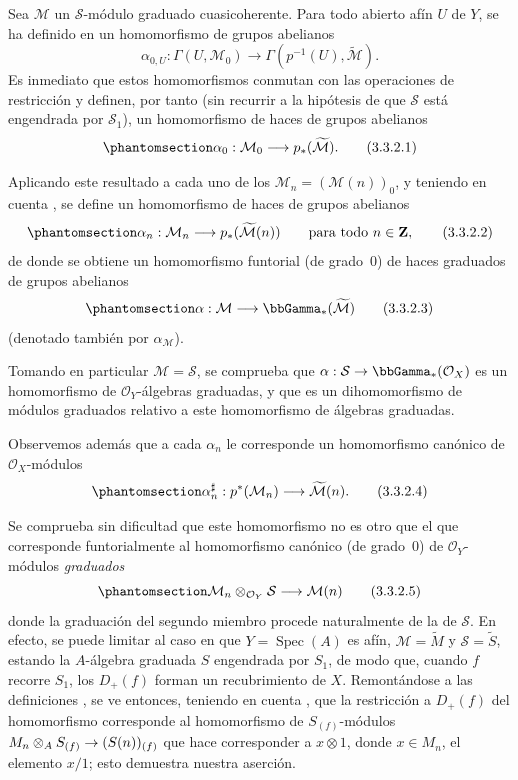 \documentclass[oneside,10pt]{amsart}
\makeatletter
\newcommand{\ega@arrow}[2]{\mathchoice{#1}{#2}{#2}{#2}}
\renewcommand{\to}{\ega@arrow{\longrightarrow}{\rightarrow}}
\newcommand{\oldpage}[2][]{\marginnote{\normalfont\footnotesize\textbf{#1}~|~#2}\ignorespaces}
\let\EGAOriginalLabel\label
\renewcommand{\label}[1]{\phantomsection\EGAOriginalLabel{#1}}
\makeatother
\begin{document}
\begin{env}[3.3.2]
\label{II.3.3.2-fr}
Sea $\mathcal{M}$ un $\mathcal{S}$-módulo graduado cuasicoherente.
Para todo abierto afín $U$ de $Y$, se ha definido en  un homomorfismo de grupos abelianos
\[
  \alpha_{0,U}:\Gamma(U,\mathcal{M}_0)
  \longrightarrow\Gamma(p^{-1}(U),\widetilde{\mathcal{M}}).
\]
Es inmediato que estos homomorfismos conmutan con las operaciones de restricción  y definen, por tanto (sin recurrir a la hipótesis de que $\mathcal{S}$ está engendrada por $\mathcal{S}_1$), un homomorfismo de haces de grupos abelianos
\[
\label{II.3.3.2.1-fr}
  \alpha_0:\mathcal{M}_0\longrightarrow p_*(\widetilde{\mathcal{M}}).
\tag{3.3.2.1}
\]

Aplicando este resultado a cada uno de los $\mathcal{M}_n=(\mathcal{M}(n))_0$, y teniendo en cuenta , se define un homomorfismo de haces de grupos abelianos
\[
\label{II.3.3.2.2-fr}
  \alpha_n:\mathcal{M}_n\longrightarrow
  p_*(\widetilde{\mathcal{M}}(n))
  \qquad\text{para todo }n\in\mathbf{Z},
\tag{3.3.2.2}
\]
de donde se obtiene un homomorfismo funtorial (de grado~$0$) de haces graduados de grupos abelianos
\[
\label{II.3.3.2.3-fr}
  \alpha:\mathcal{M}\longrightarrow\bbGamma_*(\widetilde{\mathcal{M}})
\tag{3.3.2.3}
\]
(denotado también por $\alpha_{\mathcal{M}}$).

Tomando en particular $\mathcal{M}=\mathcal{S}$, se comprueba que $\alpha:\mathcal{S}\to\bbGamma_*(\mathcal{O}_X)$ es un homomorfismo de $\mathcal{O}_Y$-álgebras graduadas, y que  es un dihomomorfismo de módulos graduados relativo a este homomorfismo de álgebras graduadas.

Observemos además que a cada $\alpha_n$ le corresponde  un homomorfismo canónico de $\mathcal{O}_X$-módulos
\[
\label{II.3.3.2.4-fr}
  \alpha_n^\sharp:p^*(\mathcal{M}_n)
  \longrightarrow\widetilde{\mathcal{M}}(n).
\tag{3.3.2.4}
\]

Se comprueba sin dificultad que este homomorfismo no es otro que el que corresponde funtorialmente  al homomorfismo canónico (de grado~$0$) de $\mathcal{O}_Y$-módulos \emph{graduados}
\[
\label{II.3.3.2.5-fr}
  \mathcal{M}_n\otimes_{\mathcal{O}_Y}\mathcal{S}
  \longrightarrow\mathcal{M}(n)
\tag{3.3.2.5}
\]
\oldpage[II]{58}
donde la graduación del segundo miembro procede naturalmente de la de $\mathcal{S}$.
En efecto, se puede limitar al caso en que $Y=\operatorname{Spec}(A)$ es afín, $\mathcal{M}=\widetilde{M}$ y $\mathcal{S}=\widetilde{S}$, estando la $A$-álgebra graduada $S$ engendrada por $S_1$, de modo que, cuando $f$ recorre $S_1$, los $D_+(f)$ forman un recubrimiento de $X$.
Remontándose a las definiciones , se ve entonces, teniendo en cuenta , que la restricción a $D_+(f)$ del homomorfismo  corresponde  al homomorfismo de $S_{(f)}$-módulos
$M_n\otimes_A S_{(f)}\to(S(n))_{(f)}$
que hace corresponder a $x\otimes1$, donde $x\in M_n$, el elemento $x/1$; esto demuestra nuestra aserción.
\end{env}
\end{document}
